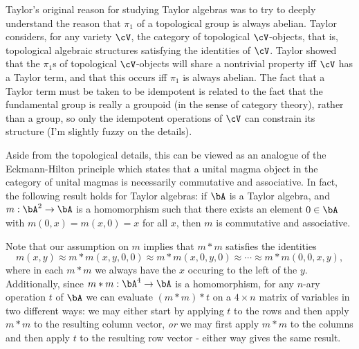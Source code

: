\begin{rem}\label{gen-eckmann-hilton} Taylor's original reason for studying Taylor algebras was to try to deeply understand the reason that $\pi_1$ of a topological group is always abelian. Taylor \cite{taylor-varieties} considers, for any variety $\cV$, the category of topological $\cV$-objects, that is, topological algebraic structures satisfying the identities of $\cV$. Taylor showed that the $\pi_1$s of topological $\cV$-objects will share a nontrivial property iff $\cV$ has a Taylor term, and that this occurs iff $\pi_1$ is always abelian. The fact that a Taylor term must be taken to be idempotent is related to the fact that the fundamental group is really a groupoid (in the sense of category theory), rather than a group, so only the idempotent operations of $\cV$ can constrain its structure (I'm slightly fuzzy on the details).

Aside from the topological details, this can be viewed as an analogue of the Eckmann-Hilton principle \cite{eckmann-hilton} which states that a unital magma object in the category of unital magmas is necessarily commutative and associative. In fact, the following result holds for Taylor algebras: if $\bA$ is a Taylor algebra, and $m : \bA^2 \rightarrow \bA$ is a homomorphism such that there exists an element $0 \in \bA$ with $m(0,x) = m(x,0) = x$ for all $x$, then $m$ is commutative and associative.

Note that our assumption on $m$ implies that $m*m$ satisfies the identities
\[
m(x,y) \approx m*m(x,y,0,0) \approx m*m(x,0,y,0) \approx \cdots \approx m*m(0,0,x,y),
\]
where in each $m*m$ we always have the $x$ occuring to the left of the $y$. Additionally, since $m*m : \bA^4 \rightarrow \bA$ is a homomorphism, for any $n$-ary operation $t$ of $\bA$ we can evaluate $(m*m)*t$ on a $4\times n$ matrix of variables in two different ways: we may either start by applying $t$ to the rows and then apply $m*m$ to the resulting column vector, \emph{or} we may first apply $m*m$ to the columns and then apply $t$ to the resulting row vector - either way gives the same result.


\end{rem}
